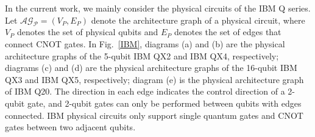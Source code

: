 \documentclass[runningheads]{llncs}
\begin{document}



In the current work, we mainly consider the physical circuits of the IBM Q series.
Let $\mathcal{\mathcal{AG}_{P}}=(V_{P}, E_{P})$ denote the architecture graph of a physical circuit,
where $V_{P}$ denotes the set of physical qubits and $E_{P}$ denotes the set of edges that connect CNOT gates.
In Fig.~\ref{IBM}, diagrams (a) and (b) are the physical architecture graphs of the 5-qubit IBM QX2 and IBM QX4, respectively; diagrams (c) and (d) are the physical architecture graphs of the 16-qubit IBM QX3 and IBM QX5, respectively; diagram (e) is the physical architecture graph of IBM Q20.
The direction in each edge indicates the control direction of a 2-qubit gate,
and 2-qubit gates can only be performed between qubits with edges connected.
IBM physical circuits only support single quantum gates and CNOT gates between two adjacent qubits.
\end{document}
